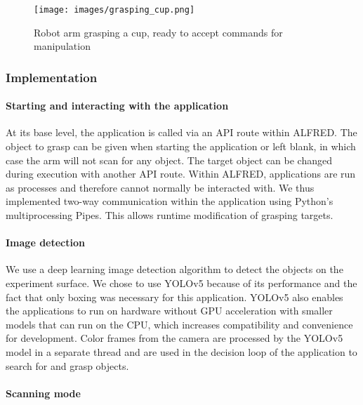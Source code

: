 \begin{figure}[h]
    \centering
    \texttt{[image: images/grasping\_cup.png]}
    \caption{Robot arm grasping a cup, ready to accept commands for manipulation}
    \label{fig:grasping_cup}
\end{figure}

\subsubsection{Implementation}

\paragraph{Starting and interacting with the application}

At its base level, the application is called via an API route within ALFRED. The object to grasp can be given when starting the application or left blank, in which case the arm will not scan for any object. The target object can be changed during execution with another API route. Within ALFRED, applications are run as processes and therefore cannot normally be interacted with. We thus implemented two-way communication within the application using Python's multiprocessing Pipes. This allows runtime modification of grasping targets.

\paragraph{Image detection}

We use a deep learning image detection algorithm to detect the objects on the experiment surface. We chose to use YOLOv5\cite{yolov5} because of its performance and the fact that only boxing was necessary for this application. YOLOv5 also enables the applications to run on hardware without GPU acceleration with smaller models that can run on the CPU, which increases compatibility and convenience for development. Color frames from the camera are processed by the YOLOv5 model in a separate thread and are used in the decision loop of the application to search for and grasp objects.

\paragraph{Scanning mode}

